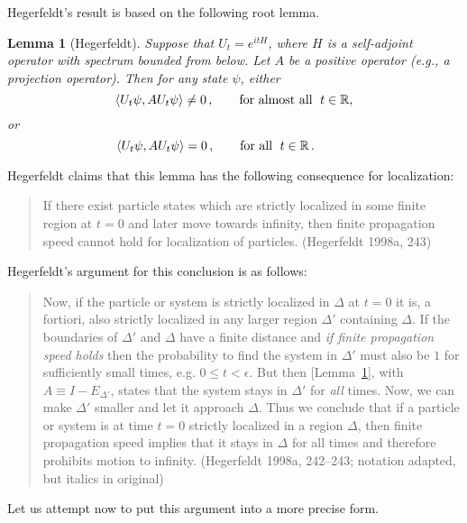 \documentclass[11pt]{article}
\newtheorem{lemma}{Lemma}
\theoremstyle{remark}
\begin{document}
Hegerfeldt's result is based on the following root lemma.
\begin{lemma}[Hegerfeldt] Suppose that $U_{t}=e^{itH}$, where $H$ is a
  self-adjoint operator with spectrum bounded from below.  Let $A$ be
  a positive operator (e.g., a projection operator).  Then for any
  state $\psi$, either
\[ \langle U_{t}\psi
,AU_{t}\psi \rangle \neq 0\,, \qquad \mbox{\textnormal{for almost all
    }}\; t\in \mathbb{R} ,\] or
\[ \hspace{-3em} \langle U_{t}\psi
,AU_{t}\psi \rangle =0\,, \qquad \mbox{\textnormal{for all }}\; t\in
\mathbb{R} \,.\] \label{gch}
\end{lemma}
Hegerfeldt claims that this lemma has the following consequence for
localization:
\begin{quote} If there exist particle states which are strictly
  localized in some finite region at $t=0$ and later move towards
  infinity, then finite propagation speed cannot hold for localization
  of particles. (Hegerfeldt 1998a, 243) \end{quote} Hegerfeldt's
argument for this conclusion is as follows: \begin{quote} Now, if the
  particle or system is strictly localized in $\Delta $ at $t=0$ it
  is, a fortiori, also strictly localized in any larger region $\Delta
  '$ containing $\Delta$.  If the boundaries of $\Delta '$ and
  $\Delta$ have a finite distance and \emph{if finite propagation
    speed holds} then the probability to find the system in $\Delta '$
  must also be $1$ for sufficiently small times, e.g.  $0\leq
  t<\epsilon$.  But then [Lemma~\ref{gch}], with $A\equiv I-E_{\Delta
    '}$, states that the system stays in $\Delta '$ for \emph{all}
  times.  Now, we can make $\Delta '$ smaller and let it approach
  $\Delta$.  Thus we conclude that if a particle or system is at time
  $t=0$ strictly localized in a region $\Delta$, then finite
  propagation speed implies that it stays in $\Delta$ for all times
  and therefore prohibits motion to infinity.  (Hegerfeldt 1998a,
  242--243; notation adapted, but italics in original)
\end{quote}  Let us attempt now to put this argument into a more precise form.
\end{document}
